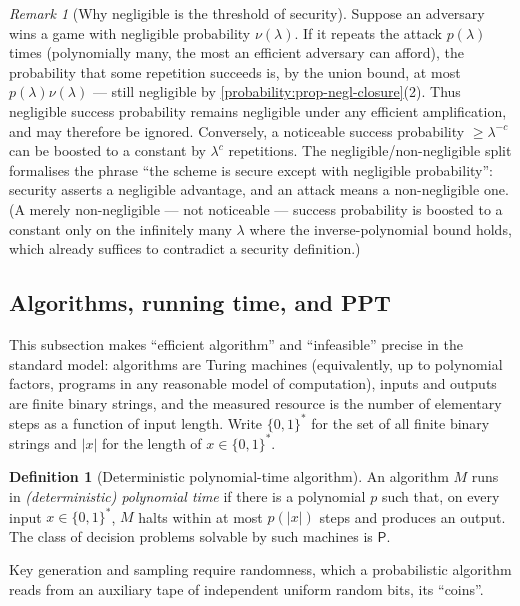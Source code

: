 \documentclass[11pt,a4paper]{article}
\theoremstyle{definition}
\newtheorem{definition}[theorem]{Definition}
\theoremstyle{remark}
\newtheorem{remark}[theorem]{Remark}
\providecommand{\abs}[1]{\lvert #1 \rvert}
\begin{document}
\begin{remark}[Why negligible is the threshold of security]
\label{probability:rem-negl}
Suppose an adversary wins a game with negligible probability
\(\nu(\lambda)\). If it repeats the attack \(p(\lambda)\) times
(polynomially many, the most an efficient adversary can afford), the
probability that some repetition succeeds is, by the union bound, at
most \(p(\lambda)\nu(\lambda)\) --- still negligible by
\cref{probability:prop-negl-closure}(2). Thus negligible success
probability remains negligible under any efficient amplification, and
may therefore be ignored. Conversely, a noticeable success probability
\({\ge}\lambda^{-c}\) can be boosted to a constant by \(\lambda^{c}\)
repetitions. The negligible/non-negligible split formalises the
phrase ``the scheme is secure except with negligible
probability'': security asserts a negligible advantage, and an attack
means a non-negligible one. (A merely non-negligible --- not
noticeable --- success probability is boosted to a constant only on
the infinitely many \(\lambda\) where the inverse-polynomial bound
holds, which already suffices to contradict a security definition.)
\end{remark}

\subsection{Algorithms, running time, and PPT}

This subsection makes ``efficient algorithm'' and ``infeasible''
precise in the standard model: algorithms are Turing machines
(equivalently, up to polynomial factors, programs in any reasonable
model of computation), inputs and outputs are finite binary strings,
and the measured resource is the number of elementary steps as a
function of input length. Write \(\{0,1\}^*\) for the set of all
finite binary strings and \(\abs{x}\) for the length of
\(x \in \{0,1\}^*\).

\begin{definition}[Deterministic polynomial-time algorithm]
\label{probability:def-pt}
An algorithm \(M\) runs in \emph{(deterministic) polynomial time} if
there is a polynomial \(p\) such that, on every input
\(x \in \{0,1\}^*\), \(M\) halts within at most \(p(\abs{x})\) steps
and produces an output. The class of decision problems solvable by
such machines is \(\mathsf{P}\).
\end{definition}

Key generation and sampling require randomness, which a probabilistic
algorithm reads from an auxiliary tape of independent uniform random
bits, its ``coins''.
\end{document}
